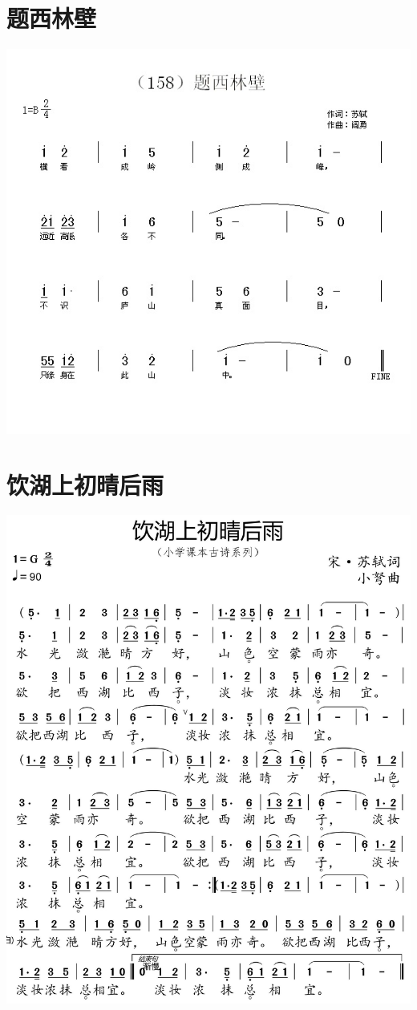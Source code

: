 \documentclass[cn,pad,chinesefont=nofont]{elegantbook}
\begin{document}
\section{题西林壁}
    \includegraphics[width=\textwidth]{dongxiao/20200627-苏轼-题西林壁.jpg} 
\section{饮湖上初晴后雨}
    \includegraphics[width=\textwidth]{dongxiao/20200627-苏轼-饮湖上初晴后雨.jpg} 
\end{document}
